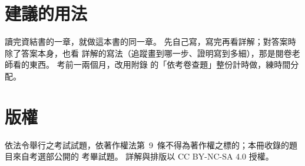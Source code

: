 \section*{建議的用法}

讀完資結書的一章，就做這本書的同一章。 先自己寫，寫完再看詳解；對答案時除了答案本身，也看
詳解的寫法（追蹤畫到哪一步、證明寫到多細），那是閱卷老師看的東西。 考前一兩個月，改用附錄
的「依考卷查題」整份計時做，練時間分配。

\section*{版權}

依法令舉行之考試試題，依著作權法第~9~條不得為著作權之標的；本冊收錄的題目來自考選部公開的
考畢試題。 詳解與排版以 CC BY-NC-SA 4.0 授權。
